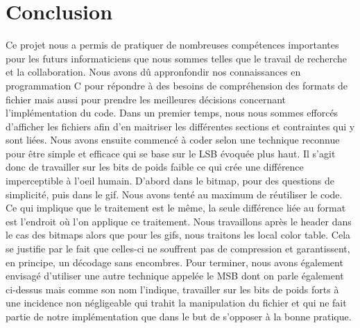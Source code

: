 \section {Conclusion}
Ce projet nous a permis de pratiquer de nombreuses compétences importantes pour les futurs informaticiens que nous sommes
telles que le travail de recherche et la collaboration.
Nous avons dû appronfondir nos connaissances en programmation C pour répondre à des besoins de compréhension des formats 
de fichier mais aussi pour prendre les meilleures décisions concernant l'implémentation du code.
Dans un premier temps, nous nous sommes efforcés d'afficher les fichiers afin d'en maitriser les différentes sections
et contraintes qui y sont liées.
Nous avons ensuite commencé à coder selon une technique reconnue pour être simple et efficace qui se base sur le LSB évoquée
plus haut. Il s'agit donc de travailler sur les bits de poids faible ce qui crée une différence imperceptible à l'oeil humain.
D'abord dans le bitmap, pour des questions de simplicité, puis dans le gif.
Nous avons tenté au maximum de réutiliser le code. 
Ce qui implique que le traitement est le même, la seule différence liée au format est l'endroit où l'on applique ce traitement.
Nous travaillons après le header dans le cas des bitmaps alors que pour les gifs, nous traitons les local color table.
Cela se justifie par le fait que celles-ci ne souffrent pas de compression et garantissent, en principe, un décodage sans encombres.
Pour terminer, nous avons également envisagé d'utiliser une autre technique appelée le MSB dont on parle également ci-dessus mais
comme son nom l'indique, travailler sur les bits de poids forts à une incidence non négligeable qui trahit la manipulation du fichier
et qui ne fait partie de notre implémentation que dans le but de s'opposer à la bonne pratique.
 